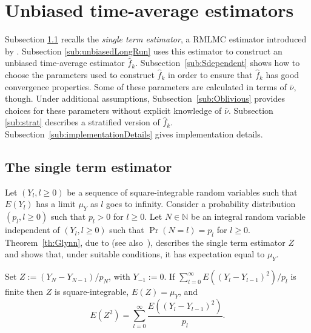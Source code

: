\documentclass[a4paper,11pt]{article}
\begin{document}
\section{Unbiased time-average estimators}\label{se:UnbiasedEstimators}
Subsection \ref{sub:singleTermEstimator} recalls the \emph{single term estimator},  a RMLMC estimator      introduced by \citet{GlynnRhee2015unbiased}. Subsection \ref{sub:unbiasedLongRun}  uses this estimator to construct an unbiased time-average estimator \(\hat f_{k}\). Subsection~\ref{sub:Sdependent} shows how to choose the parameters used to construct    \(\hat f_{k}\) in order to ensure that   \(\hat f_{k}\) has good convergence properties. Some of these parameters are calculated in terms  of  \(\bar\nu\), though.
Under additional assumptions, Subsection~\ref{sub:Oblivious} provides choices for these parameters without explicit knowledge of  \(\bar\nu\). Subsection \ref{sub:strat} describes a stratified version of   \(\hat f_{k}\). Subsection~\ref{sub:implementationDetails} gives implementation details.      
\subsection{The single term estimator}\label{sub:singleTermEstimator} Let   \((Y_{l}, l\geq0)\) be a sequence of   square-integrable random variables such that \(E(Y_{l})\) has a limit \(\mu_{Y}\) as \(l\) goes to infinity.    Consider a probability distribution \((p_{l},l\geq0)\)  such that  \(p_{l}>0\) for \(l\geq0\). Let   \(N\in\mathbb{N}\)  be an integral  random variable independent of  \((Y_{l}, l\geq0)\)  such that \(\Pr(N=l)=p_{l}\)   for \(l\geq0\). Theorem~\ref{th:Glynn}, due to \citet{GlynnRhee2015unbiased}  (see also~\cite[Theorem 2]{Vihola2018}),  describes the single term estimator \(Z\) and shows that, under suitable conditions, it has expectation equal to  \(\mu_{Y}\).  
\begin{theorem}\label{th:Glynn}    Set \(Z:=(Y_{N}-Y_{N-1})/p_{N}\), with  \(Y_{-1}:=0\). If \(\sum^{\infty}_{l=0}E((Y_{l}-Y_{l-1})^{2})/p_{l}\) is finite  then \(Z\) is square-integrable, \(E(Z)=\mu_{Y}\), and
\begin{equation*}
E(Z^{2})=\sum^{\infty}_{l=0}\frac{E((Y_{l}-Y_{l-1})^{2})}{p_{l}}.
\end{equation*}
\end{theorem}
\end{document}

